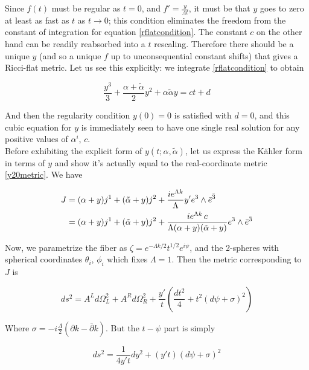 Since $f(t)$ must be regular as $t=0$, and $f' = \frac{y}{\Lambda t}$, it must be that $y$ goes to zero at least as fast as $t$ as $t\rightarrow 0$; this condition eliminates the freedom from the constant of integration for equation \ref{rflatcondition}. The constant $c$ on the other hand can be readily reabsorbed into a $t$ rescaling. Therefore there should be a unique $y$ (and so a unique $f$ up to unconsequential constant shifts) that gives a Ricci-flat metric. Let us see this explicitly: we integrate \ref{rflatcondition} to obtain

\begin{equation}
	\frac{y^3}{3} + \frac{\alpha + \tilde{\alpha}}{2} y^2 + \alpha \tilde{\alpha} y = ct + d \label{rflatintegrated}
\end{equation}

And then the regularity condition $y(0)=0$ is satisfied with $d=0$, and this cubic equation for $y$ is immediately seen to have one single real solution for any positive values of $\alpha^i$, $c$.\\

Before exhibiting the explicit form of $y(t;\alpha,\tilde\alpha)$, let us express the K\"ahler form in terms of $y$ and show it's actually equal to the real-coordinate metric \ref{y20metric}. We have

\begin{align}
	\label{Jintermsofy}
	J & =  (\alpha + y) j^1 + (\tilde{\alpha} + y) j^2 + \frac{ie^{\Lambda k}}\Lambda y' e^3 \wedge \bar e^{\bar 3}\\
	  & =  (\alpha + y) j^1 + (\tilde{\alpha} + y) j^2 + \frac{ie^{\Lambda k} \,c}{\Lambda (\alpha + y)(\tilde{\alpha} + y)} e^3 \wedge \bar e^{\bar 3}
\end{align}

Now, we parametrize the fiber as $\zeta = e^{-\Lambda k/2} t^{1/2} e^{i\psi}$, and the 2-spheres with spherical coordinates $\theta_i$, $\phi_i$ which fixes $\Lambda = 1$. Then the metric corresponding to $J$ is

\begin{equation}
	ds^2 = A^L d\Omega^2_L + A^R d\Omega^2_R + \frac{y'}{t} \left( \frac{dt^2}{4} + t^2 (d\psi + \sigma)^2 \right)
\end{equation}

Where $\sigma = -i\frac{\Lambda}{2}(\partial k - \bar \partial k)$. But the $t-\psi$ part is simply

\begin{equation}
	ds^2 = \frac{1}{4y't} dy^2 + (y' t) (d\psi + \sigma)^2
\end{equation}

